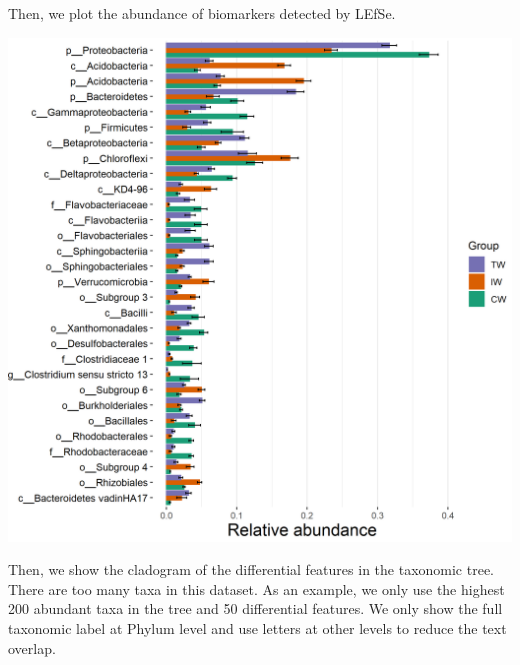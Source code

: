 \documentclass[
]{book}
\newenvironment{Shaded}{\begin{snugshade}}{\end{snugshade}}
\newcommand{\AttributeTok}[1]{\textcolor[rgb]{0.77,0.63,0.00}{#1}}
\newcommand{\CommentTok}[1]{\textcolor[rgb]{0.56,0.35,0.01}{\textit{#1}}}
\newcommand{\DecValTok}[1]{\textcolor[rgb]{0.00,0.00,0.81}{#1}}
\newcommand{\FunctionTok}[1]{\textcolor[rgb]{0.00,0.00,0.00}{#1}}
\newcommand{\NormalTok}[1]{#1}
\newcommand{\SpecialCharTok}[1]{\textcolor[rgb]{0.00,0.00,0.00}{#1}}
\begin{document}
Then, we plot the abundance of biomarkers detected by LEfSe.

\begin{Shaded}
\end{Shaded}

\begin{center}\includegraphics[width=650px]{Images/plot_lefse_diff_abund} \end{center}

Then, we show the cladogram of the differential features in the taxonomic tree.
There are too many taxa in this dataset.
As an example, we only use the highest 200 abundant taxa in the tree and 50 differential features.
We only show the full taxonomic label at Phylum level and use letters at other levels to reduce the text overlap.

\begin{Shaded}
\end{Shaded}
\end{document}
